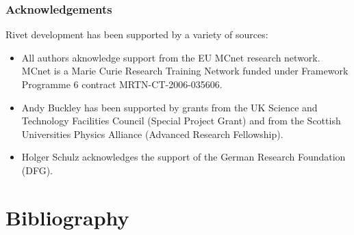 \documentclass{JHEP3}
\begin{document}
\section{Acknowledgements}
\label{app:acknowledgements}

Rivet development has been supported by a variety of sources:

\begin{itemize}
\item All authors aknowledge support from the EU MCnet research network. MCnet
  is a Marie Curie Research Training Network funded under Framework Programme 6
  contract MRTN-CT-2006-035606.
\item Andy Buckley has been supported by grants from the UK Science and
  Technology Facilities Council (Special Project Grant) and from the Scottish
  Universities Physics Alliance (Advanced Research Fellowship).
\item Holger Schulz acknowledges the support of the German Research Foundation (DFG).
\end{itemize}


\cleardoublepage
\part{Bibliography}

{\raggedright
  
}
\end{document}
